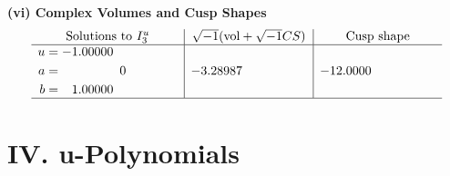 \documentclass[1p]{elsarticle_modified}
\theoremstyle{definition}
\newcommand{\I}{\sqrt{-1}}
\begin{document}
\newpage\flushleft \textbf{(vi) Complex Volumes and Cusp Shapes}
$$\begin{array}{c|c|c}  
\text{Solutions to }I^u_{3}& \I (\text{vol} + \sqrt{-1}CS) & \text{Cusp shape}\\
 \hline 
\begin{aligned}
u &= -1.00000\phantom{ +0.000000I} \\
a &= \phantom{-0.000000 } 0 \\
b &= \phantom{-}1.00000\phantom{ +0.000000I}\end{aligned}
 & -3.28987\phantom{ +0.000000I} & -12.0000\phantom{ +0.000000I}\\
 \hline 
 \end{array}$$\newpage
\newpage\renewcommand{\arraystretch}{1}
\centering \section*{ IV. u-Polynomials}
\end{document}
